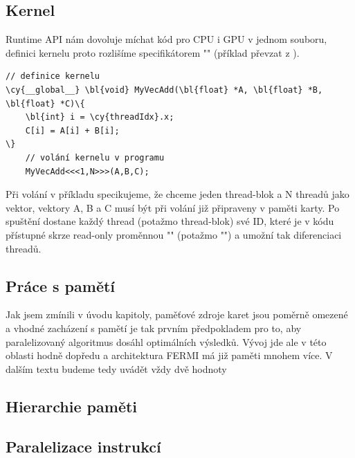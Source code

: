     \subsection{Kernel}
    
    Runtime API nám dovoluje míchat kód pro CPU i GPU v jednom souboru, definici kernelu proto rozlišíme specifikátorem 
    \Vr"" (příklad převzat z \cite{CUDA programming g.}).
    
    \begin{Verbatim}[commandchars = \\\{\}]
    // definice kernelu
\cy{__global__} \bl{void} MyVecAdd(\bl{float} *A, \bl{float} *B, \bl{float} *C)\{
    \bl{int} i = \cy{threadIdx}.x;
    C[i] = A[i] + B[i];
\}
    // volání kernelu v programu
    MyVecAdd<<<1,N>>>(A,B,C);
    \end{Verbatim}

    Při volání v příkladu specikujeme, že chceme jeden thread-blok a N threadů jako vektor, vektory A, B a C musí být při volání již připraveny v paměti karty. Po spuštění dostane každý thread (potažmo thread-blok) své ID, které je v kódu přístupné skrze read-only proměnnou \Vr"" (potažmo \Vr"") a umožní tak diferenciaci threadů.
    
    \subsection{Práce s pamětí}
    
    Jak jsem zmínili v úvodu kapitoly, paměťové zdroje karet jsou poměrně omezené a vhodné zacházení s pamětí je tak prvním předpokladem pro to, aby paralelizovaný algoritmus dosáhl optimálních výsledků. Vývoj jde ale v této oblasti hodně dopředu a architektura FERMI má již paměti mnohem více. V dalším textu budeme tedy uvádět vždy dvě hodnoty



    \subsection{Hierarchie paměti}
    \subsection{Paralelizace instrukcí}


